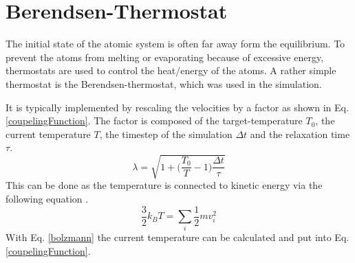 \section{Berendsen-Thermostat}
\begin{comment}
- couple the moleclular system to a larger heat bath
- thermostat controls the heat of the simulation so the system does not melt or evaporate
\end{comment}
The initial state of the atomic system is often far away form the equilibrium. To prevent the atoms from melting or evaporating because of excessive energy, thermostats are used to control the heat/energy of the atoms. A rather simple thermostat is the Berendsen-thermostat, which was used in the simulation. 
\par
It is typically implemented by rescaling the velocities by a factor as shown in Eq.  \ref{coupelingFunction}. The factor is composed of the target-temperature $T_{0}$, the current temperature $T$, the timestep of the simulation $\Delta{t}$ and the relaxation time $\tau$. 
\begin{equation}
	\label{coupelingFunction}
	\lambda = \sqrt{1 + \bigg(\frac{T_{0}}{T} -1\bigg)\frac{\Delta t}{\tau}}
\end{equation}
This can be done as the temperature is connected to kinetic energy via the following equation \cite[cf.][]{molDymCourse}. 
\begin{equation}
	\label{bolzmann}
	\frac{3}{2} k_{B} T = \sum_{i} \frac{1}{2} m v_{i}^2
\end{equation}
With Eq. \ref{bolzmann} the current temperature can be calculated and put into Eq. \ref{coupelingFunction}.



